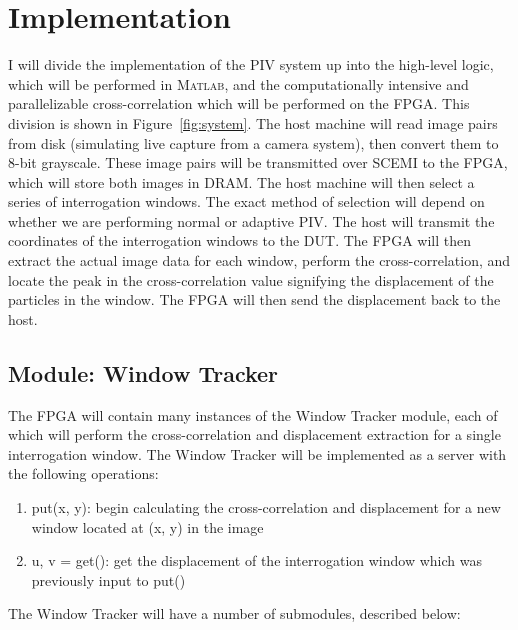 \documentclass{article}
\begin{document}
	\section{Implementation}
	I will divide the implementation of the PIV system up into the high-level logic, which will be performed in \textsc{Matlab}, and the computationally intensive and parallelizable cross-correlation which will be performed on the FPGA. This division is shown in Figure~\ref{fig:system}. The host machine will read image pairs from disk (simulating live capture from a camera system), then convert them to 8-bit grayscale. These image pairs will be transmitted over SCEMI to the FPGA, which will store both images in DRAM. The host machine will then select a series of interrogation windows. The exact method of selection will depend on whether we are performing normal or adaptive PIV. The host will transmit the coordinates of the interrogation windows to the DUT. The FPGA will then extract the actual image data for each window, perform the cross-correlation, and locate the peak in the cross-correlation value signifying the displacement of the particles in the window. The FPGA will then send the displacement back to the host. 

	\subsection{Module: Window Tracker}
	The FPGA will contain many instances of the Window Tracker module, each of which will perform the cross-correlation and displacement extraction for a single interrogation window. The Window Tracker will be implemented as a server with the following operations: 
	\begin{enumerate}
		\item put(x, y): begin calculating the cross-correlation and displacement for a new window located at (x, y) in the image
		\item u, v = get(): get the displacement of the interrogation window which was previously input to put()
	\end{enumerate}
	The Window Tracker will have a number of submodules, described below:
\end{document}
